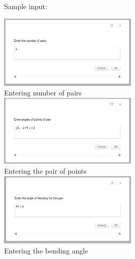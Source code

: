 \documentclass[a4paper,12pt]{article}
\begin{document}
Sample input:

{\centering
\includegraphics[width = 0.5\textwidth]{Entering Number of Pairs.png}\\
Entering number of pairs\\
\includegraphics[width = 0.5\textwidth]{Entering the pair of points.png}\\
Entering the pair of points\\
\includegraphics[width = 0.5\textwidth]{Entering the bending angle.png}\\
Entering the bending angle\\
}\par
\end{document}
